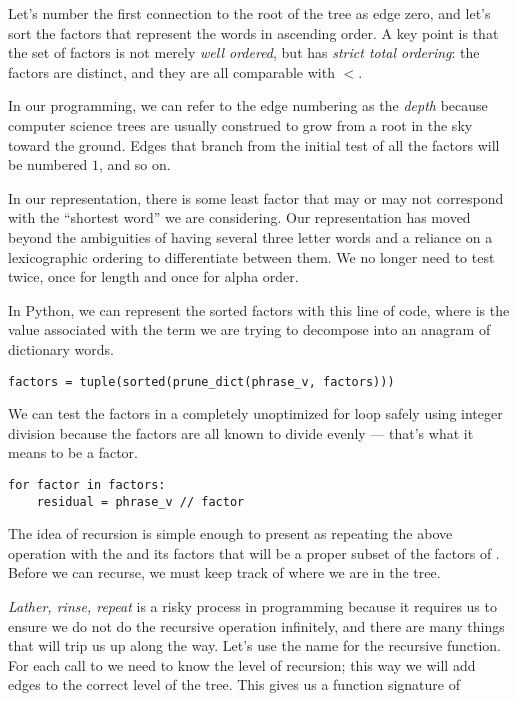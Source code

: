 \documentclass[letterpaper, 11pt]{article}
\begin{document}
Let's number the first connection to the root of the tree as edge
zero, and let's sort the factors that represent the words in ascending
order. A key point is that the set of factors is not merely \emph{well
ordered}, but has \emph{strict total ordering}: the factors are
distinct, and they are all comparable with $<$.

In our programming, we can refer to the edge numbering as the
\emph{depth} because computer science trees are usually construed
to grow from a root in the sky toward the ground. Edges that branch
from the initial test of all the factors will be numbered $1$, and
so on.

In our representation, there is some least factor that may or may
not correspond with the ``shortest word'' we are considering.  Our
representation has moved beyond the ambiguities of having several
three letter words and a reliance on a lexicographic ordering to
differentiate between them. We no longer need to test twice, once
for length and once for alpha order.

In Python, we can represent the sorted factors with this line of
code, where  is the value associated with the term
we are trying to decompose into an anagram of dictionary words.

\begin{verbatim}
factors = tuple(sorted(prune_dict(phrase_v, factors)))
\end{verbatim}

We can test the factors in a completely unoptimized for loop safely
using integer division because the factors are all known to divide
 evenly --- that's what it means to be a factor.

\begin{verbatim}
for factor in factors:
    residual = phrase_v // factor
\end{verbatim}

The idea of recursion is simple enough to present as repeating the
above operation with the  and its factors that will
be a proper subset of the factors of . Before we can
recurse, we must keep track of where we are in the tree.

\emph{Lather, rinse, repeat} is a risky process in programming
because it requires us to ensure we do not do the recursive operation
infinitely, and there are many things that will trip us up along
the way. Let's use the name  for the recursive
function. For each call to  we need to know the
level of recursion; this way we will add edges to the correct level
of the tree. This gives us a function signature of
\end{document}
